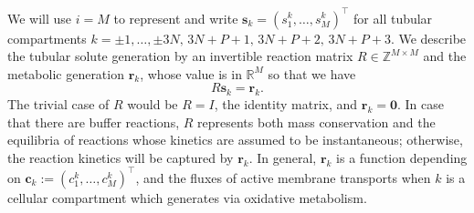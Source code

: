 \documentclass{article}
\begin{document}
We will use $i=M$ to represent  and write $\mathbf{s}_k = (s_1^k,\dots,s_M^k)^\top$ for all tubular compartments $k=\pm 1,\dots,\pm 3N,\, 3N+P+1,\, 3N+P+2,\, 3N+P+3$.
We describe the tubular solute generation by an invertible reaction matrix $R\in \mathbb{Z}^{M\times M}$ and the metabolic generation $\mathbf{r}_k$, whose value is in $\mathbb{R}^M$ so that we have
\begin{equation}\label{eq:gen}
    R \mathbf{s}_k = \mathbf{r}_k.
\end{equation}
The trivial case of $R$ would be $R=I$, the identity matrix, and $\mathbf{r}_k=\mathbf{0}$.
In case that there are buffer reactions, $R$ represents both mass conservation and the equilibria of reactions whose kinetics are assumed to be instantaneous; otherwise, the reaction kinetics will be captured by $\mathbf{r}_k$.
In general, $\mathbf{r}_k$ is a function depending on $\mathbf{c}_k:=(c_1^k,\dots,c_M^k)^\top$, and the fluxes of active membrane transports when $k$ is a cellular compartment which generates  via oxidative metabolism.
\end{document}
